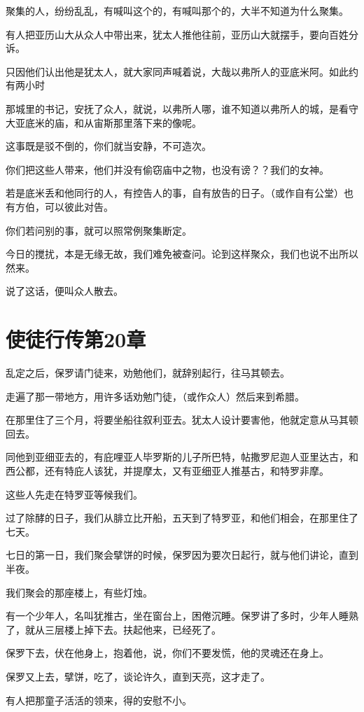 \documentclass[12pt,oneside]{book}
\begin{document}
聚集的人，纷纷乱乱，有喊叫这个的，有喊叫那个的，大半不知道为什么聚集。

有人把亚历山大从众人中带出来，犹太人推他往前，亚历山大就摆手，要向百姓分诉。

只因他们认出他是犹太人，就大家同声喊着说，大哉以弗所人的亚底米阿。如此约有两小时

那城里的书记，安抚了众人，就说，以弗所人哪，谁不知道以弗所人的城，是看守大亚底米的庙，和从宙斯那里落下来的像呢。

这事既是驳不倒的，你们就当安静，不可造次。

你们把这些人带来，他们并没有偷窃庙中之物，也没有谤？？我们的女神。

若是底米丢和他同行的人，有控告人的事，自有放告的日子。（或作自有公堂）也有方伯，可以彼此对告。

你们若问别的事，就可以照常例聚集断定。

今日的搅扰，本是无缘无故，我们难免被查问。论到这样聚众，我们也说不出所以然来。

说了这话，便叫众人散去。

\chapter{使徒行传第20章}
乱定之后，保罗请门徒来，劝勉他们，就辞别起行，往马其顿去。

走遍了那一带地方，用许多话劝勉门徒，（或作众人）然后来到希腊。

在那里住了三个月，将要坐船往叙利亚去。犹太人设计要害他，他就定意从马其顿回去。

同他到亚细亚去的，有庇哩亚人毕罗斯的儿子所巴特，帖撒罗尼迦人亚里达古，和西公都，还有特庇人该犹，并提摩太，又有亚细亚人推基古，和特罗非摩。

这些人先走在特罗亚等候我们。

过了除酵的日子，我们从腓立比开船，五天到了特罗亚，和他们相会，在那里住了七天。

七日的第一日，我们聚会擘饼的时候，保罗因为要次日起行，就与他们讲论，直到半夜。

我们聚会的那座楼上，有些灯烛。

有一个少年人，名叫犹推古，坐在窗台上，困倦沉睡。保罗讲了多时，少年人睡熟了，就从三层楼上掉下去。扶起他来，已经死了。

保罗下去，伏在他身上，抱着他，说，你们不要发慌，他的灵魂还在身上。

保罗又上去，擘饼，吃了，谈论许久，直到天亮，这才走了。

有人把那童子活活的领来，得的安慰不小。
\end{document}
